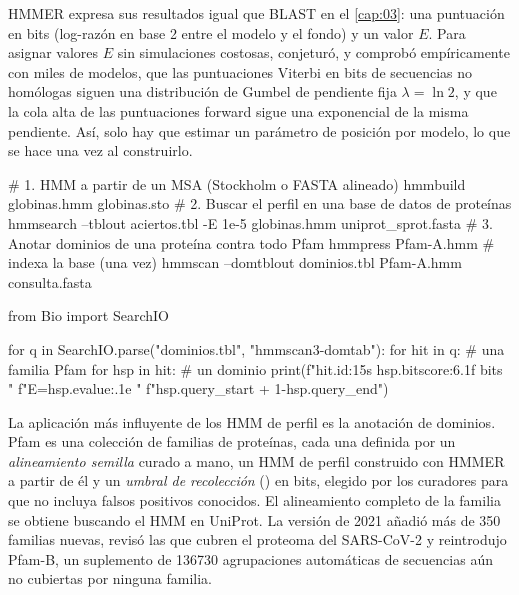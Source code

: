 HMMER expresa sus resultados igual que BLAST en el \cref{cap:03}: una puntuación en bits (log-razón en base 2 entre el modelo y el fondo) y un valor $E$. Para asignar valores $E$ sin simulaciones costosas, \textcite{c04-eddy2011} conjeturó, y comprobó empíricamente con miles de modelos, que las puntuaciones Viterbi en bits de secuencias no homólogas siguen una distribución de Gumbel de pendiente fija $\lambda=\ln2$, y que la cola alta de las puntuaciones forward sigue una exponencial de la misma pendiente. Así, solo hay que estimar un parámetro de posición por modelo, lo que se hace una vez al construirlo.

\begin{consola}
# 1. HMM a partir de un MSA (Stockholm o FASTA alineado)
hmmbuild globinas.hmm globinas.sto
# 2. Buscar el perfil en una base de datos de proteínas
hmmsearch --tblout aciertos.tbl -E 1e-5 globinas.hmm uniprot_sprot.fasta
# 3. Anotar dominios de una proteína contra todo Pfam
hmmpress Pfam-A.hmm                       # indexa la base (una vez)
hmmscan --domtblout dominios.tbl Pfam-A.hmm consulta.fasta
\end{consola}

\begin{codigo}
from Bio import SearchIO

for q in SearchIO.parse("dominios.tbl", "hmmscan3-domtab"):
    for hit in q:                              # una familia Pfam
        for hsp in hit:                        # un dominio
            print(f"{hit.id:15s} {hsp.bitscore:6.1f} bits  "
                  f"E={hsp.evalue:.1e}  "
                  f"{hsp.query_start + 1}-{hsp.query_end}")
\end{codigo}

La aplicación más influyente de los HMM de perfil es la anotación de dominios. Pfam \parencite{c04-mistry2021} es una colección de familias de proteínas, cada una definida por un \emph{alineamiento semilla} curado a mano, un HMM de perfil construido con HMMER a partir de él y un \emph{umbral de recolección} () en bits, elegido por los curadores para que no incluya falsos positivos conocidos. El alineamiento completo de la familia se obtiene buscando el HMM en UniProt. La versión de 2021 añadió más de 350 familias nuevas, revisó las que cubren el proteoma del SARS-CoV-2 y reintrodujo Pfam-B, un suplemento de \num{136730} agrupaciones automáticas de secuencias aún no cubiertas por ninguna familia.

